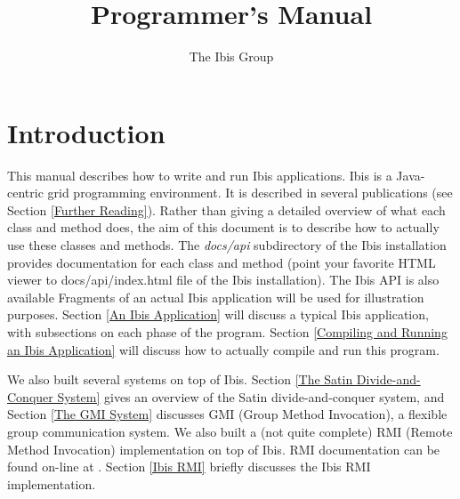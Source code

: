 \documentclass[10pt]{article}
\begin{document}
\title{
{}
{}
Programmer's Manual}

\author{The Ibis Group}

\maketitle

\section{Introduction}

This manual describes how to write and run Ibis applications.
Ibis is a Java-centric grid programming environment.
It is described in several publications (see Section \ref{Further Reading}).
Rather than giving a detailed overview of what each class and method does,
the aim of this document is to describe how to actually use these classes
and methods.
The \emph{docs/api} subdirectory of the Ibis installation provides
documentation for each class and method (point your favorite HTML viewer
to docs/api/index.html file of the Ibis installation).
The Ibis API is also available
Fragments of an actual Ibis application will be used for illustration purposes.
Section \ref{An Ibis Application} will discuss a typical Ibis application,
with subsections on each phase of the program.
Section \ref{Compiling and Running an Ibis Application} will discuss how to
actually compile and run this program.

We also built several systems on top of Ibis.
Section \ref{The Satin Divide-and-Conquer System}
gives an overview of the Satin divide-and-conquer
system, and Section \ref{The GMI System} discusses GMI
(Group Method Invocation),
a flexible group communication system.
We also built a (not quite complete) RMI (Remote Method Invocation)
implementation on top of Ibis. RMI documentation can be found on-line at
{}
{}.
Section \ref{Ibis RMI} briefly discusses the Ibis RMI implementation.
\end{document}
